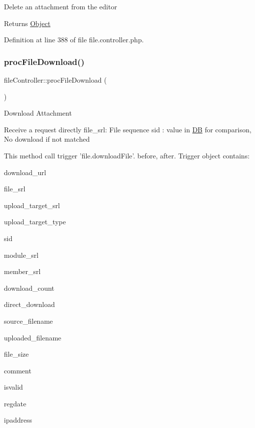 Delete an attachment from the editor

\begin{DoxyReturn}{Returns}
\hyperlink{classObject}{Object} 
\end{DoxyReturn}


Definition at line 388 of file file.\+controller.\+php.

\mbox{\label{classfileController_a11ac8c819e791e103ed113b3927975af}} 
\subsubsection{\texorpdfstring{proc\+File\+Download()}{procFileDownload()}}
{\footnotesize\ttfamily file\+Controller\+::proc\+File\+Download (\begin{DoxyParamCaption}{ }\end{DoxyParamCaption})}

Download Attachment


\begin{DoxyPre}
Receive a request directly
file\_srl: File sequence
sid : value in \hyperlink{classDB}{DB} for comparison, No download if not matched\end{DoxyPre}



\begin{DoxyPre}This method call trigger 'file.downloadFile'.
before, after.
Trigger object contains:
\begin{DoxyItemize}
\item download\_url
\item file\_srl
\item upload\_target\_srl
\item upload\_target\_type
\item sid
\item module\_srl
\item member\_srl
\item download\_count
\item direct\_download
\item source\_filename
\item uploaded\_filename
\item file\_size
\item comment
\item isvalid
\item regdate
\item ipaddress

\end{DoxyItemize}\end{DoxyPre}



